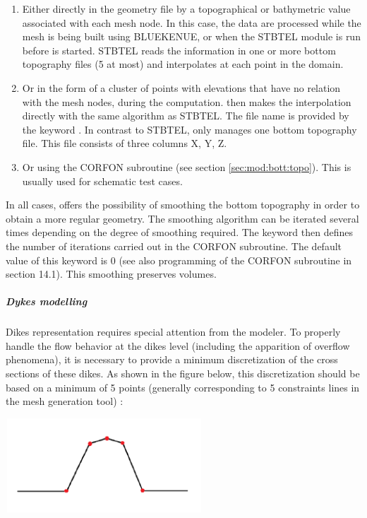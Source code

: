 \begin{enumerate}
\item  Either directly in the geometry file by a topographical or bathymetric value associated with each mesh node. In this case, the data are processed while the mesh is being built using BLUEKENUE, or when the STBTEL module is run before  is started. STBTEL reads the information in one or more bottom topography files (5 at most) and interpolates at each point in the domain.

\item  Or in the form of a cluster of points with elevations that have no relation with the mesh nodes, during the  computation.  then makes the interpolation directly with the same algorithm as STBTEL. The file name is provided by the keyword . In contrast to STBTEL,  only manages one bottom topography file. This file consists of three columns X, Y, Z.

\item  Or using the CORFON subroutine (see section \ref{sec:mod:bott:topo}). This is usually used for schematic test cases.
\end{enumerate}

 In all cases,  offers the possibility of smoothing the bottom topography in order to obtain a more regular geometry. The smoothing algorithm can be iterated several times depending on the degree of smoothing required. The keyword  then defines the number of iterations carried out in the CORFON subroutine. The default value of this keyword is 0 (see also programming of the CORFON subroutine in section 14.1). This smoothing preserves volumes.


\subparagraph{ Dykes modelling}

 Dikes representation requires special attention from the modeler. To properly handle the flow behavior at the dikes level (including the apparition of overflow phenomena), it is necessary to provide a minimum discretization of the cross sections of these dikes. As shown in the figure below, this discretization should be based on a minimum of 5 points (generally corresponding to 5 constraints lines in the mesh generation tool) :

 \includegraphics*[width=2.91in, height=1.39in, keepaspectratio=false]{./graphics/dyke.png}

